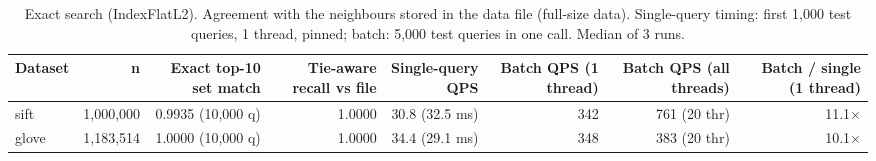 \begin{table}[t]
\centering
\small
\begin{adjustbox}{max width=\linewidth}
\begin{tabular}{lrrrrrrr}
\toprule
Dataset & n & Exact top-10 set match & Tie-aware recall vs file & Single-query QPS & Batch QPS (1 thread) & Batch QPS (all threads) & Batch / single (1 thread) \\
\midrule
sift & 1,000,000 & 0.9935 (10,000 q) & 1.0000 & 30.8 (32.5 ms) & 342 & 761 (20 thr) & 11.1$\times$ \\
glove & 1,183,514 & 1.0000 (10,000 q) & 1.0000 & 34.4 (29.1 ms) & 348 & 383 (20 thr) & 10.1$\times$ \\
\bottomrule
\end{tabular}
\end{adjustbox}
\caption{Exact search (IndexFlatL2). Agreement with the neighbours stored in the data file (full-size data). Single-query timing: first 1,000 test queries, 1 thread, pinned; batch: 5,000 test queries in one call. Median of 3 runs.}
\label{tab:part1}
\end{table}

